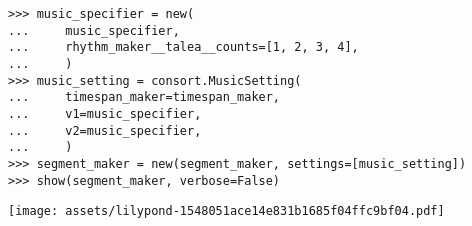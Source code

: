 \begin{comment}
<abjad>[stylesheet=../consort.ily]
music_specifier = new(
    music_specifier,
    rhythm_maker__talea__counts=[1, 2, 3, 4],
    )
music_setting = consort.MusicSetting(
    timespan_maker=timespan_maker,
    v1=music_specifier,
    v2=music_specifier,
    )
segment_maker = new(segment_maker, settings=[music_setting])
show(segment_maker, verbose=False)
</abjad>
\end{comment}

\begin{abjadbookoutput}
\begin{singlespacing}
\vspace{-0.5\baselineskip}
\begin{lstlisting}
>>> music_specifier = new(
...     music_specifier,
...     rhythm_maker__talea__counts=[1, 2, 3, 4],
...     )
>>> music_setting = consort.MusicSetting(
...     timespan_maker=timespan_maker,
...     v1=music_specifier,
...     v2=music_specifier,
...     )
>>> segment_maker = new(segment_maker, settings=[music_setting])
>>> show(segment_maker, verbose=False)
\end{lstlisting}
\noindent\texttt{[image: assets/lilypond-1548051ace14e831b1685f04ffc9bf04.pdf]}
\end{singlespacing}
\end{abjadbookoutput}

\begin{comment}
<abjad>[stylesheet=../consort.ily]
other_music_specifier = consort.MusicSpecifier(
    pitch_handler=consort.AbsolutePitchHandler(pitch_specifier='g fs e f'),
    rhythm_maker=rhythmmakertools.EvenDivisionRhythmMaker(
        denominators=[8],
        extra_counts_per_division=(1,),
        ),
    )
other_music_setting = consort.MusicSetting(
    timespan_maker=consort.TaleaTimespanMaker(
        initial_silence_talea=rhythmmakertools.Talea([1], 2),
        silence_talea=rhythmmakertools.Talea([1], 2),
        ),
    v1=other_music_specifier,
    v2=other_music_specifier,
    )
segment_maker = new(
    segment_maker,
    settings=[music_setting, other_music_setting],
    )
show(segment_maker, verbose=False)
</abjad>
\end{comment}

